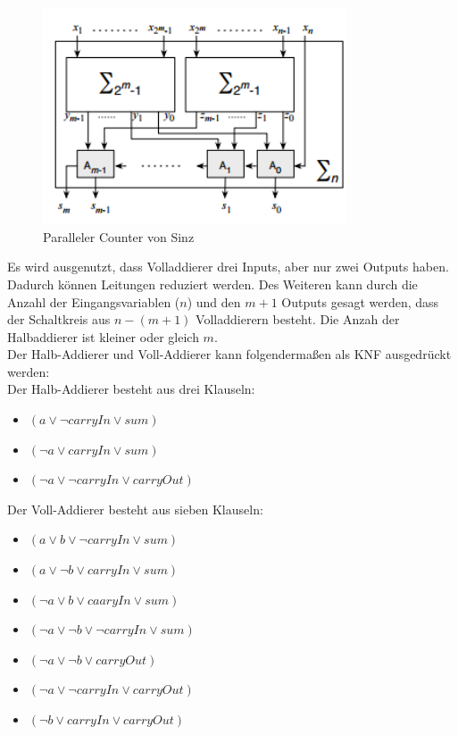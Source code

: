\documentclass[a4,abstract=on]{scrartcl}
\begin{document}
\begin{figure}[H]
\centering
\includegraphics[width=9cm]{Sinz_para.png}
\caption{Paralleler Counter von Sinz \cite[siehe][Seite 9] {sinz}}
\label{fig:sinz_counter_para}
\end{figure}

Es wird ausgenutzt, dass Volladdierer drei Inputs, aber nur zwei Outputs haben. Dadurch können Leitungen reduziert werden. Des Weiteren kann durch die Anzahl der Eingangsvariablen ($n$) und den $m+1$ Outputs gesagt werden, dass der Schaltkreis aus $n-(m+1)$ Volladdierern besteht. Die Anzah der Halbaddierer ist kleiner oder gleich $m$.\\

Der Halb-Addierer und Voll-Addierer kann folgendermaßen als KNF ausgedrückt werden:\\
Der Halb-Addierer besteht aus drei Klauseln:
\begin{itemize}
\item $(a \vee \neg carryIn \vee sum)$
\item $(\neg a \vee carryIn \vee sum)$
\item $(\neg a \vee \neg carryIn \vee carryOut )$
\end{itemize}

Der Voll-Addierer besteht aus sieben Klauseln:
\begin{itemize}
\item $(a \vee b \vee \neg carryIn \vee sum)$
\item $( a \vee \neg b \vee carryIn \vee sum)$
\item $(\neg a \vee b \vee caaryIn \vee sum )$
\item $(\neg a \vee \neg b \vee \neg carryIn \vee sum)$
\item$(\neg a \vee \neg b \vee carryOut)$
\item$(\neg a \vee \neg carryIn \vee carryOut)$
\item$(\neg b \vee carryIn \vee carryOut)$
\end{itemize}
\end{document}
